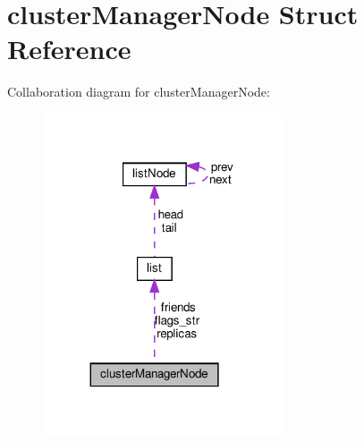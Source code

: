 \hypertarget{structcluster_manager_node}{}\section{cluster\+Manager\+Node Struct Reference}
\label{structcluster_manager_node}


Collaboration diagram for cluster\+Manager\+Node\+:
\nopagebreak
\begin{figure}[H]
\begin{center}
\leavevmode
\includegraphics[width=200pt]{structcluster_manager_node__coll__graph}
\end{center}
\end{figure}
